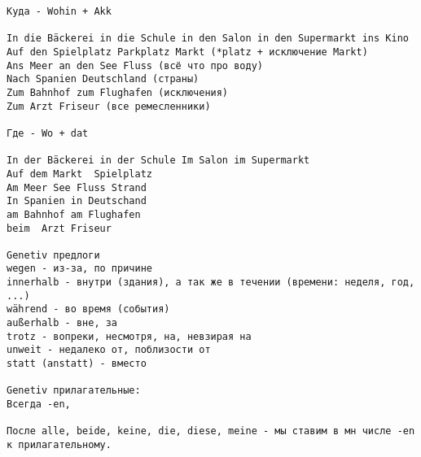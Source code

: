 \documentclass[12pt,a4paper]{report}
\begin{document}
\begin{verbatim}
Куда - Wohin + Akk

In die Bäckerei in die Schule in den Salon in den Supermarkt ins Kino
Auf den Spielplatz Parkplatz Markt (*platz + исключение Markt)
Ans Meer an den See Fluss (всё что про воду)
Nach Spanien Deutschland (страны)
Zum Bahnhof zum Flughafen (исключения)
Zum Arzt Friseur (все ремесленники)

Где - Wo + dat

In der Bäckerei in der Schule Im Salon im Supermarkt
Auf dem Markt  Spielplatz
Am Meer See Fluss Strand
In Spanien in Deutschand
am Bahnhof am Flughafen
beim  Arzt Friseur

Genetiv предлоги
wegen - из-за, по причине
innerhalb - внутри (здания), а так же в течении (времени: неделя, год, ...)
während - во время (события)
außerhalb - вне, за
trotz - вопреки, несмотря, на, невзирая на
unweit - недалеко от, поблизости от
statt (anstatt) - вместо

Genetiv прилагательные:
Всегда -en,

После alle, beide, keine, die, diese, meine - мы ставим в мн числе -en к прилагательному.
\end{verbatim}
\end{document}
